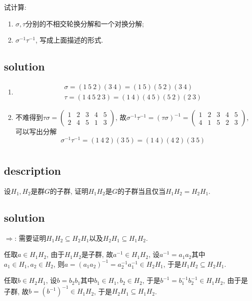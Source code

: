 \documentclass[UTF-8]{ctexart}
\begin{document}
试计算:
\begin{enumerate}
	\item $\sigma, \tau$分别的不相交轮换分解和一个对换分解;
	\item $\sigma^{-1}\tau^{-1}$, 写成上面描述的形式.
\end{enumerate}
\subsection{solution}
\begin{enumerate}
	\item \begin{align*}
	\sigma = (1\ 5\ 2)(3\ 4) = (1\ 5)(5\ 2)(3\ 4)\\
	\tau = (1\ 4\ 5\ 2\ 3) = (1\ 4)(4\ 5)(5\ 2)(2\ 3)
	\end{align*}
	\item 不难得到$\tau\sigma = \begin{pmatrix}
	1 & 2 & 3 & 4 & 5\\
	2 & 4 & 5 & 1 & 3
	\end{pmatrix}$, 故$\sigma^{-1}\tau^{-1} = (\tau\sigma)^{-1} = \begin{pmatrix}
	1 & 2 & 3 & 4 & 5\\
	4 & 1 & 5 & 2 & 3
	\end{pmatrix}$, 可以写出分解
	$$\sigma^{-1}\tau^{-1} = (1\ 4\ 2)(3\ 5) = (1\ 4)(4\ 2)(3\ 5)$$
\end{enumerate}
\section{}
\subsection{description}
设$H_1, H_2$是群$G$的子群, 证明$H_1H_2$是$G$的子群当且仅当$H_1H_2 = H_2H_1$.
\subsection{solution}
$\Rightarrow$: 需要证明$H_1H_2 \subseteq H_2H_1$以及$H_2H_1 \subseteq H_1H_2$.

任取$a \in H_1H_2$, 由于$H_1H_2$是子群, 故$a^{-1} \in H_1H_2$, 设$a^{-1} = a_1a_2$其中$a_1 \in H_1, a_2 \in H_2$, 则$a = (a_1a_2)^{-1} = a_2^{-1}a_1^{-1} \in H_2H_1$, 于是$H_1H_2 \subseteq H_2H_1$.

任取$b \in H_2H_1$, 设$b = b_2b_1$其中$b_1 \in H_1, b_2 \in H_2$, 于是$b^{-1} = b_1^{-1}b_2^{-1} \in H_1H_2$, 由于是子群, 故$b = (b^{-1})^{-1} \in H_1H_2$, 于是$H_2H_1 \subseteq H_1H_2$.
\end{document}
